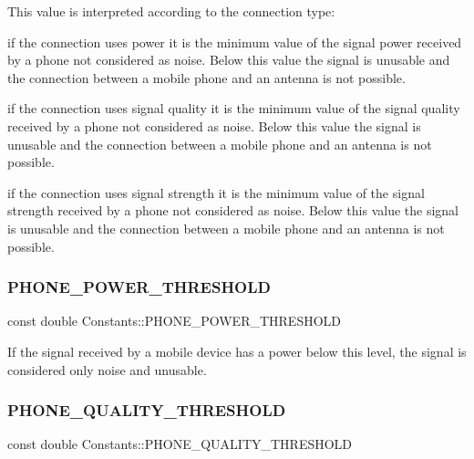 This value is interpreted according to the connection type\+:
\begin{DoxyItemize}
\item if the connection uses power it is the minimum value of the signal power received by a phone not considered as noise. Below this value the signal is unusable and the connection between a mobile phone and an antenna is not possible.
\item if the connection uses signal quality it is the minimum value of the signal quality received by a phone not considered as noise. Below this value the signal is unusable and the connection between a mobile phone and an antenna is not possible.
\item if the connection uses signal strength it is the minimum value of the signal strength received by a phone not considered as noise. Below this value the signal is unusable and the connection between a mobile phone and an antenna is not possible. 
\end{DoxyItemize}\mbox{\label{class_constants_a1e95cbdc2db02f6147ddf8ac61a428ab}} 
\subsubsection{\texorpdfstring{PHONE\_POWER\_THRESHOLD}{PHONE\_POWER\_THRESHOLD}}
{\footnotesize\ttfamily const double Constants\+::\+P\+H\+O\+N\+E\+\_\+\+P\+O\+W\+E\+R\+\_\+\+T\+H\+R\+E\+S\+H\+O\+LD\hspace{0.3cm}{\ttfamily [static]}}

If the signal received by a mobile device has a power below this level, the signal is considered only noise and unusable. \mbox{\label{class_constants_a2c8a9d965bae29c19ff18c8b80260982}} 
\subsubsection{\texorpdfstring{PHONE\_QUALITY\_THRESHOLD}{PHONE\_QUALITY\_THRESHOLD}}
{\footnotesize\ttfamily const double Constants\+::\+P\+H\+O\+N\+E\+\_\+\+Q\+U\+A\+L\+I\+T\+Y\+\_\+\+T\+H\+R\+E\+S\+H\+O\+LD\hspace{0.3cm}{\ttfamily [static]}}

